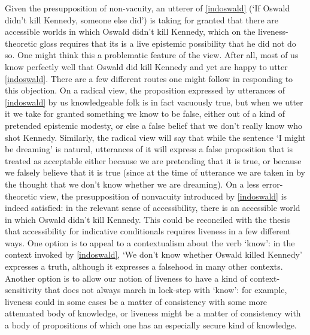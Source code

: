 \documentclass[If.tex]{subfiles}
\begin{document}
Given the presupposition of non-vacuity, an utterer of \ref{indoswald} (‘If Oswald didn't kill Kennedy, someone else did’) is taking for granted that there are accessible worlds in which Oswald didn't kill Kennedy, which on the liveness-theoretic gloss requires that its is a live epistemic possibility that he did not do so. One might think this a problematic feature of the view.  After all, most of us know perfectly well that Oswald did kill Kennedy and yet are happy to utter \ref{indoswald}. There are a few different routes one might follow in responding to this objection. On a radical view, the proposition expressed by utterances of \ref{indoswald} by us knowledgeable folk is in fact vacuously true, but when we utter it we take for granted something we know to be false, either out of a kind of pretended epistemic modesty, or else a false belief that we don't really know who shot Kennedy. Similarly, the radical view will say that while the sentence ‘I might be dreaming’ is natural, utterances of it will express a false proposition that is treated as acceptable either because we are pretending that it is true, or because we falsely believe that it is true (since at the time of utterance we are taken in by the thought that we don't know whether we are dreaming). On a less error-theoretic view, the presupposition of nonvacuity introduced by \ref{indoswald} is indeed satisfied: in the relevant sense of accessibility, there is an accessible world in which Oswald didn't kill Kennedy. This could be reconciled with the thesis that accessibility for indicative conditionals requires liveness in a few different ways. One option is to appeal to a contextualism about the verb ‘know’: in the context invoked by \ref{indoswald}, ‘We don't know whether Oswald killed Kennedy’ expresses a truth, although it expresses a falsehood in many other contexts. Another option is to allow our notion of liveness to have a kind of context-sensitivity that does not always march in lock-step with ‘know’: for example, liveness could in some cases be a matter of consistency with some more attenuated body of knowledge, or liveness might be a matter of consistency with a body of propositions of which one has an especially secure kind of knowledge.
\end{document}
